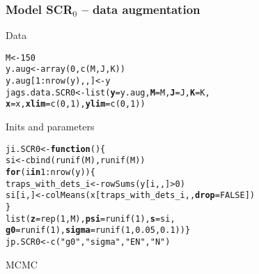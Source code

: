 \documentclass[color=usenames,dvipsnames]{beamer}\usepackage[]{graphicx}\usepackage[]{xcolor}
\makeatletter
\newcommand{\hlnum}[1]{\textcolor[rgb]{0.69,0.494,0}{#1}}%
\newcommand{\hlsng}[1]{\textcolor[rgb]{0.749,0.012,0.012}{#1}}%
\newcommand{\hlopt}[1]{\textcolor[rgb]{0,0,0}{#1}}%
\newcommand{\hldef}[1]{\textcolor[rgb]{0,0,0}{#1}}%
\newcommand{\hlkwa}[1]{\textcolor[rgb]{0,0,0}{\textbf{#1}}}%
\newcommand{\hlkwb}[1]{\textcolor[rgb]{0,0.341,0.682}{#1}}%
\newcommand{\hlkwc}[1]{\textcolor[rgb]{0,0,0}{\textbf{#1}}}%
\newcommand{\hlkwd}[1]{\textcolor[rgb]{0.004,0.004,0.506}{#1}}%
\newenvironment{kframe}{%
 \def\at@end@of@kframe{}%
 \ifinner\ifhmode%
  \def\at@end@of@kframe{\end{minipage}}%
  \begin{minipage}{\columnwidth}%
 \fi\fi%
 \def\FrameCommand##1{\hskip\@totalleftmargin \hskip-\fboxsep
 \colorbox{shadecolor}{##1}\hskip-\fboxsep
     \hskip-\linewidth \hskip-\@totalleftmargin \hskip\columnwidth}%
 \MakeFramed {\advance\hsize-\width
   \@totalleftmargin\z@ \linewidth\hsize
   \@setminipage}}%
 {\par\unskip\endMakeFramed%
 \at@end@of@kframe}
\newenvironment{knitrout}{}{} %
\makeatother
\begin{document}
\begin{frame}[fragile]
  \frametitle{Model SCR$_0$ -- data augmentation}
  Data
  \vspace{-6pt}
\begin{knitrout}\scriptsize
{}\color{fgcolor}\begin{kframe}
\begin{alltt}
\hldef{M} \hlkwb{<-} \hlnum{150}
\hldef{y.aug} \hlkwb{<-} \hlkwd{array}\hldef{(}\hlnum{0}\hldef{,} \hlkwd{c}\hldef{(M, J, K))}
\hldef{y.aug[}\hlnum{1}\hlopt{:}\hlkwd{nrow}\hldef{(y),,]} \hlkwb{<-} \hldef{y}
\hldef{jags.data.SCR0} \hlkwb{<-} \hlkwd{list}\hldef{(}\hlkwc{y}\hldef{=y.aug,} \hlkwc{M}\hldef{=M,} \hlkwc{J}\hldef{=J,} \hlkwc{K}\hldef{=K,}
                       \hlkwc{x}\hldef{=x,} \hlkwc{xlim}\hldef{=}\hlkwd{c}\hldef{(}\hlnum{0}\hldef{,}\hlnum{1}\hldef{),} \hlkwc{ylim}\hldef{=}\hlkwd{c}\hldef{(}\hlnum{0}\hldef{,}\hlnum{1}\hldef{))}
\end{alltt}
\end{kframe}
\end{knitrout}
\pause
\vfill
  Inits and parameters
  \vspace{-6pt}
\begin{knitrout}\scriptsize
{}\color{fgcolor}\begin{kframe}
\begin{alltt}
\hldef{ji.SCR0} \hlkwb{<-} \hlkwa{function}\hldef{() \{}
  \hldef{si} \hlkwb{<-} \hlkwd{cbind}\hldef{(}\hlkwd{runif}\hldef{(M),} \hlkwd{runif}\hldef{(M))}
  \hlkwa{for}\hldef{(i} \hlkwa{in} \hlnum{1}\hlopt{:}\hlkwd{nrow}\hldef{(y)) \{}
    \hldef{traps_with_dets_i} \hlkwb{<-} \hlkwd{rowSums}\hldef{(y[i,,]}\hlopt{>}\hlnum{0}\hldef{)}
    \hldef{si[i,]} \hlkwb{<-} \hlkwd{colMeans}\hldef{(x[traps_with_dets_i,,}\hlkwc{drop}\hldef{=}\hlnum{FALSE}\hldef{])}
  \hldef{\}}
  \hlkwd{list}\hldef{(}\hlkwc{z}\hldef{=}\hlkwd{rep}\hldef{(}\hlnum{1}\hldef{,M),} \hlkwc{psi}\hldef{=}\hlkwd{runif}\hldef{(}\hlnum{1}\hldef{),} \hlkwc{s}\hldef{=si,}
       \hlkwc{g0}\hldef{=}\hlkwd{runif}\hldef{(}\hlnum{1}\hldef{),} \hlkwc{sigma}\hldef{=}\hlkwd{runif}\hldef{(}\hlnum{1}\hldef{,} \hlnum{0.05}\hldef{,} \hlnum{0.1}\hldef{)) \}}
\hldef{jp.SCR0} \hlkwb{<-} \hlkwd{c}\hldef{(}\hlsng{"g0"}\hldef{,} \hlsng{"sigma"}\hldef{,} \hlsng{"EN"}\hldef{,} \hlsng{"N"}\hldef{)}
\end{alltt}
\end{kframe}
\end{knitrout}
\pause
\vfill
MCMC
  \vspace{-6pt}

\end{frame}
\end{document}
